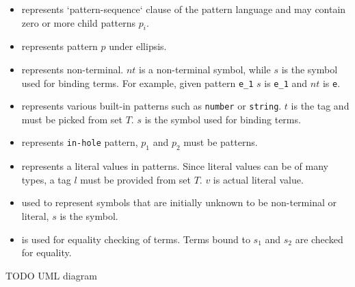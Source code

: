 \begin{itemize}
\item
\PatternSequence represents `pattern-sequence` clause of the pattern language and may contain zero or more child patterns $p_i$.

\item 
\Repeat represents pattern $p$ under ellipsis.

\item 
\Nt represents non-terminal. $nt$ is a non-terminal symbol, while $s$ is the symbol used for binding terms. For example, given pattern \texttt{e\_1} $s$ is \texttt{e\_1} and $nt$ is \texttt{e}.
\item
\BuiltInPattern represents various built-in patterns such as \texttt{number} or \texttt{string}. $t$ is the tag and must be picked from set $T$. $s$ is the symbol used for binding terms.

\item
\InHolePattern represents \texttt{in-hole} pattern, $p_1$ and $p_2$ must be patterns.

\item 
\LiteralPattern represents a literal values in patterns. Since literal values can be of many types, a tag $l$ must be provided from set $T$. $v$ is actual literal value.

\item 
\UnresolvedSymbol used to represent symbols that are initially unknown to be non-terminal or literal, $s$ is the symbol.

\item
\CheckConstraint is used for equality checking of terms. Terms bound to $s_1$ and $s_2$ are checked for equality.

\end{itemize}

TODO UML diagram




